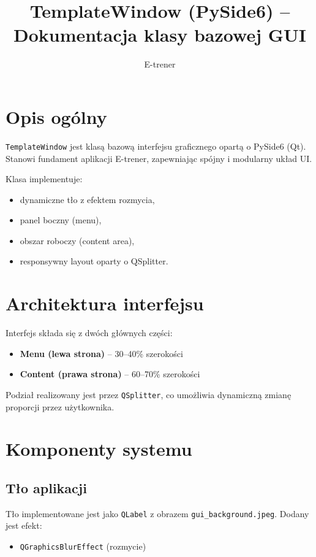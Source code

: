 \documentclass[11pt]{article}
\title{TemplateWindow (PySide6) -- Dokumentacja klasy bazowej GUI}
\author{E-trener}
\date{}
\begin{document}
\maketitle

\section{Opis ogólny}

\texttt{TemplateWindow} jest klasą bazową interfejsu graficznego opartą o PySide6 (Qt).
Stanowi fundament aplikacji E-trener, zapewniając spójny i modularny układ UI.

Klasa implementuje:
\begin{itemize}
    \item dynamiczne tło z efektem rozmycia,
    \item panel boczny (menu),
    \item obszar roboczy (content area),
    \item responsywny layout oparty o QSplitter.
\end{itemize}

\section{Architektura interfejsu}

Interfejs składa się z dwóch głównych części:

\begin{itemize}
    \item \textbf{Menu (lewa strona)} -- 30--40\% szerokości
    \item \textbf{Content (prawa strona)} -- 60--70\% szerokości
\end{itemize}

Podział realizowany jest przez \texttt{QSplitter}, co umożliwia dynamiczną zmianę proporcji przez użytkownika.

\section{Komponenty systemu}

\subsection{Tło aplikacji}

Tło implementowane jest jako \texttt{QLabel} z obrazem \texttt{gui\_background.jpeg}.
Dodany jest efekt:

\begin{itemize}
    \item \texttt{QGraphicsBlurEffect} (rozmycie)
\end{itemize}
\end{document}
